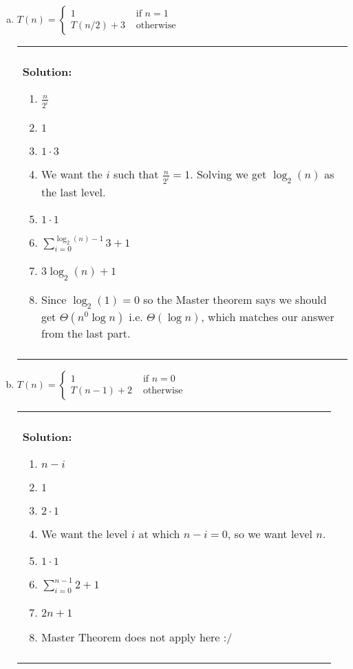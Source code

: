 \documentclass[12pt]{article}
\newenvironment{solution}
	{\begin{center}
	\begin{tabular}{|p{0.9\textwidth}|}
	\hline\\
	\textbf{Solution:}
	}
	{\\\\
	\hline
	\end{tabular}
	\end{center}
	}
\begin{document}
\newpage
\begin{enumerate}[a)]
	\item $ T(n) = \begin{cases} 1 &\text{ if } n=1\\
				T(n/2) + 3 &\text{ otherwise}
				\end{cases}$
			\begin{solution}
				\begin{enumerate}[1.]
					
					\item $\frac{n}{2^i}$ 
					\item $1$
					\item $1 \cdot 3$					
					\item We want the $i$ such that $\frac{n}{2^i} = 1$. Solving we get $\log_2(n)$ as the last level.
                    \item $1 \cdot 1$
					\item $\sum\limits_{i=0}^{\log_2(n) - 1} 3 + 1$
					\item $3\log_2(n) + 1$
					\item Since $\log_2(1) = 0$ so the Master theorem says we should get $\Theta(n^0 \log n)$ i.e. $\Theta(\log n)$, which matches our answer from the last part.
				\end{enumerate}
			\end{solution}
	\item $ T(n) = \begin{cases} 1 &\text{ if } n=0\\
				T(n-1) + 2 &\text{ otherwise}
				\end{cases}$
				\begin{solution}
					\begin{enumerate}[1.]
						\item $n-i$
						\item $1$
						\item $2\cdot 1$
						\item We want the level $i$ at which $n-i = 0$, so we want level $n$.
						\item $1 \cdot 1$
						\item $\sum\limits_{i=0}^{n-1} 2 + 1$
						\item $2n+1$
						\item Master Theorem does not apply here :/
						

\end{enumerate}
\end{solution}
\end{enumerate}
\end{document}
